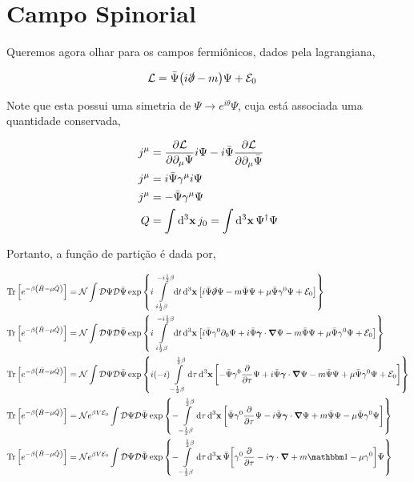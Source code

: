 \documentclass[twoside]{amsart}
\newcommand{\Dd}[1]{\mathcal D #1}
\numberwithin{equation}{section}
\begin{document}
\section{Campo Spinorial}

Queremos agora olhar para os campos fermiônicos, dados pela lagrangiana,

\begin{align}
    \mathcal L&=\bar\Psi\qty(i\slashed \partial-m)\Psi+\mathcal E_0
\end{align}

Note que esta possui uma simetria de $\Psi\rightarrow e^{i\theta}\Psi$, cuja está associada uma quantidade conservada,

\begin{align}
    j^\mu&=\pdv{\mathcal L}{\partial_\mu\Psi}i\Psi-i\bar\Psi\pdv{\mathcal L}{\partial_\mu\bar\Psi}\\
    j^\mu&=i\bar\Psi\gamma^\mu i\Psi\\
    j^\mu&=-\bar\Psi\gamma^\mu\Psi\\
    Q&=\int\dd[3]{\vb x}j_0=\int\dd[3]{\vb x}\Psi^\dagger\Psi
\end{align}

Portanto, a função de partição é dada por,

\begin{align}
    \Tr\qty[e^{-\beta\qty(\hat H-\mu\hat Q)}]&=\mathcal N\int\Dd{\Psi}\Dd{\bar\Psi}\exp\qty{i\int\limits_{i\frac12\beta}^{-i\frac12\beta}\dd{t}\dd[3]{\vb x}\qty[i\bar\Psi\slashed \partial\Psi-m\bar\Psi\Psi+\mu\bar\Psi\gamma^0\Psi+\mathcal E_0]}\\
    \Tr\qty[e^{-\beta\qty(\hat H-\mu\hat Q)}]&=\mathcal N\int\Dd{\Psi}\Dd{\bar\Psi}\exp\qty{i\int\limits_{i\frac12\beta}^{-i\frac12\beta}\dd{t}\dd[3]{\vb x}\qty[i\bar\Psi\gamma^0 \partial_0\Psi+i\bar\Psi\boldsymbol{\gamma}\cdot \grad\Psi-m\bar\Psi\Psi+\mu\bar\Psi\gamma^0\Psi+\mathcal E_0]}\\
    \Tr\qty[e^{-\beta\qty(\hat H-\mu\hat Q)}]&=\mathcal N\int\Dd{\Psi}\Dd{\bar\Psi}\exp\qty{i\qty(-i)\int\limits_{-\frac12\beta}^{\frac12\beta}\dd{\tau}\dd[3]{\vb x}\qty[-\bar\Psi\gamma^0 \pdv{}{\tau}\Psi+i\bar\Psi\boldsymbol{\gamma}\cdot \grad\Psi-m\bar\Psi\Psi+\mu\bar\Psi\gamma^0\Psi+\mathcal E_0]}\\
    \Tr\qty[e^{-\beta\qty(\hat H-\mu\hat Q)}]&=\mathcal Ne^{\beta V\mathcal E_0}\int\Dd{\Psi}\Dd{\bar\Psi}\exp\qty{-\int\limits_{-\frac12\beta}^{\frac12\beta}\dd{\tau}\dd[3]{\vb x}\qty[\bar\Psi\gamma^0 \pdv{}{\tau}\Psi-i\bar\Psi\boldsymbol{\gamma}\cdot \grad\Psi+m\bar\Psi\Psi-\mu\bar\Psi\gamma^0\Psi]}\\
    \Tr\qty[e^{-\beta\qty(\hat H-\mu\hat Q)}]&=\mathcal Ne^{\beta V\mathcal E_0}\int\Dd{\Psi}\Dd{\bar\Psi}\exp\qty{-\int\limits_{-\frac12\beta}^{\frac12\beta}\dd{\tau}\dd[3]{\vb x}\bar\Psi\qty[\gamma^0 \pdv{}{\tau}-i\boldsymbol{\gamma}\cdot \grad+m\mathbbm 1-\mu\gamma^0]\Psi}
\end{align}
\end{document}
